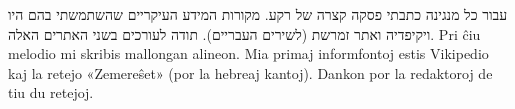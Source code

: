 \enhavo
{}

{
	\footnotesize
	\dulingvaujo
	{עבור כל מנגינה כתבתי פסקה קצרה של רקע. מקורות המידע העיקריים שהשתמשתי בהם היו ויקיפדיה ואתר זמרשת (לשירים העבריים). תודה לעורכים בשני האתרים האלה.}
	{Pri ĉiu melodio mi skribis mallongan alineon. Mia primaj informfontoj estis Vikipedio kaj la retejo «Zemereŝet» (por la hebreaj kantoj). Dankon por la redaktoroj de tiu du retejoj.}
}

\vspace{2ex}
\apartigilo
\vspace{2ex}


\renewcommand{\notesname}{}
\LTRmulticolcolumns
\begin{LTR}
	\begin{multicols}{2}
		\theendnotes
	\end{multicols}
\end{LTR}
\clearpage

